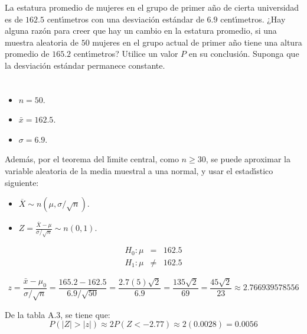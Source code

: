 \begin{enunciado}
 La estatura promedio de mujeres en el grupo de primer a\~no de cierta universidad es de $162.5$ cent\'{\i}metros con una desviaci\'on est\'andar de $6.9$ cent\'{\i}metros. ¿Hay alguna raz\'on para creer que hay un cambio en la estatura promedio, si una muestra aleatoria de $50$ mujeres en el grupo actual de primer a\~no tiene una altura promedio de $165.2$ cent\'{\i}metros? Utilice un valor $P$ en su conclusi\'on. Suponga que la desviaci\'on est\'andar permanece constante.
\end{enunciado}

\begin{solucion}
 \begin{datos}
  $\phantom{0}$
  \begin{itemize}
   \item $n = 50$.
   \item $\bar{x} = 162.5$.
   \item $\sigma = 6.9$.
  \end{itemize}
  Adem\'as, por el teorema del l\'{\i}mite central, como $n \geq 30$, se puede aproximar la variable aleatoria de la media muestral a una normal, y usar el estad\'{\i}stico siguiente:
  \begin{itemize}
   \item $\overline{X} \sim n\left( \mu , \sigma/\sqrt{n} \right)$.
   \item $Z = \frac{\overline{X} - \mu}{\sigma/\sqrt{n}}
   \sim n(0,1)$.
  \end{itemize}
 \end{datos}

 \begin{hipotesis}
  \begin{eqnarray*}
   H_0: \mu & = & 162.5 \\
   H_1: \mu & \neq & 162.5
  \end{eqnarray*}
 \end{hipotesis}

 \begin{estadistico}
  \begin{equation*}
   z = \frac{\bar{x} - \mu_0}{\sigma/\sqrt{n}} = \frac{165.2-162.5}{6.9/\sqrt{50}} = \frac{2.7(5)\sqrt{2}}{6.9} = \frac{135\sqrt{2}}{69} = \frac{45\sqrt{2}}{23} \approx 2.766939578556
  \end{equation*}
 \end{estadistico}

 \begin{valorp}
  De la tabla A.3, se tiene que:
  \begin{equation*}
   P(|Z| > |z|) \approx 2P(Z < -2.77) \approx 2(0.0028) = 0.0056
  \end{equation*}
 \end{valorp}


\end{solucion}
